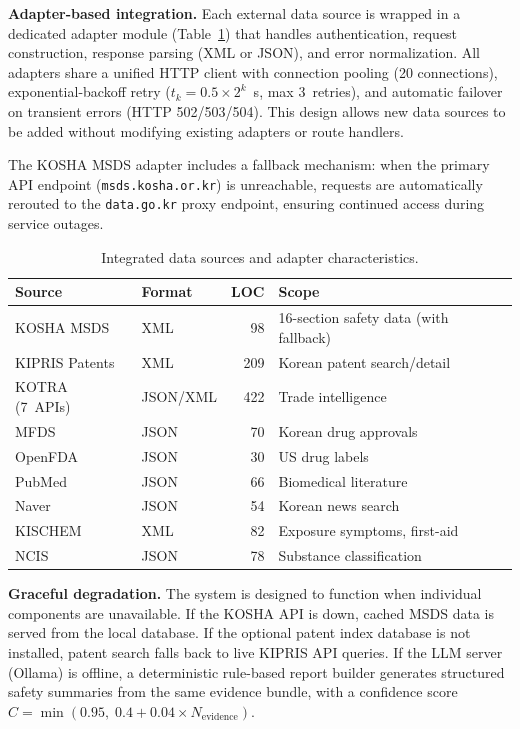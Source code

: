\documentclass[preprint,12pt]{elsarticle}
\begin{document}
\textbf{Adapter-based integration.}
Each external data source is wrapped in a dedicated adapter module (Table~\ref{tab:sources}) that handles authentication, request construction, response parsing (XML or JSON), and error normalization.
All adapters share a unified HTTP client with connection pooling (20 connections), exponential-backoff retry ($t_k = 0.5 \times 2^k$~s, max 3~retries), and automatic failover on transient errors (HTTP 502/503/504).
This design allows new data sources to be added without modifying existing adapters or route handlers.

The KOSHA MSDS adapter includes a fallback mechanism: when the primary API endpoint (\texttt{msds.kosha.or.kr}) is unreachable, requests are automatically rerouted to the \texttt{data.go.kr} proxy endpoint, ensuring continued access during service outages.

\begin{table}[H]
\centering
\caption{Integrated data sources and adapter characteristics.}
\label{tab:sources}
\small
\begin{tabular}{@{}llrl@{}}
\toprule
\textbf{Source} & \textbf{Format} & \textbf{LOC} & \textbf{Scope} \\
\midrule
KOSHA MSDS & XML & 98 & 16-section safety data (with fallback) \\
KIPRIS Patents & XML & 209 & Korean patent search/detail \\
KOTRA (7~APIs) & JSON/XML & 422 & Trade intelligence \\
MFDS & JSON & 70 & Korean drug approvals \\
OpenFDA & JSON & 30 & US drug labels \\
PubMed & JSON & 66 & Biomedical literature \\
Naver & JSON & 54 & Korean news search \\
KISCHEM & XML & 82 & Exposure symptoms, first-aid \\
NCIS & JSON & 78 & Substance classification \\
\bottomrule
\end{tabular}
\end{table}

\textbf{Graceful degradation.}
The system is designed to function when individual components are unavailable.
If the KOSHA API is down, cached MSDS data is served from the local database.
If the optional patent index database is not installed, patent search falls back to live KIPRIS API queries.
If the LLM server (Ollama) is offline, a deterministic rule-based report builder generates structured safety summaries from the same evidence bundle, with a confidence score $C = \min(0.95,\; 0.4 + 0.04 \times N_{\text{evidence}})$.
\end{document}
